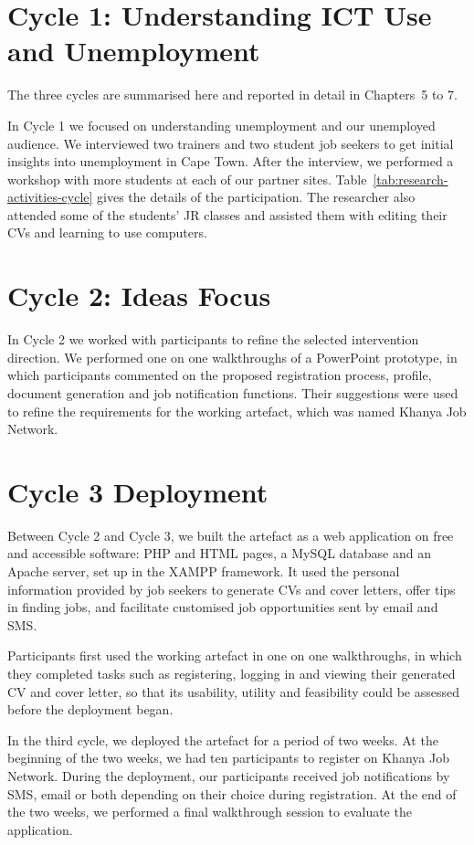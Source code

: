 \section{Cycle 1: Understanding ICT Use and Unemployment}

The three cycles are summarised here and reported in detail in Chapters~5 to 7.

In Cycle 1 we focused on understanding unemployment and our unemployed audience. We interviewed two trainers and two student job seekers to get initial insights into unemployment in Cape Town. After the interview, we performed a workshop with more students at each of our partner sites. Table~\ref{tab:research-activities-cycle} gives the details of the participation. The researcher also attended some of the students’ JR classes and assisted them with editing their CVs and learning to use computers.


\section{Cycle 2: Ideas Focus}

In Cycle 2 we worked with participants to refine the selected intervention direction. We performed one on one walkthroughs of a PowerPoint prototype, in which participants commented on the proposed registration process, profile, document generation and job notification functions. Their suggestions were used to refine the requirements for the working artefact, which was named Khanya Job Network.


\section{Cycle 3 Deployment}

Between Cycle 2 and Cycle 3, we built the artefact as a web application on free and accessible software: PHP and HTML pages, a MySQL database and an Apache server, set up in the XAMPP framework. It used the personal information provided by job seekers to generate CVs and cover letters, offer tips in finding jobs, and facilitate customised job opportunities sent by email and SMS.

Participants first used the working artefact in one on one walkthroughs, in which they completed tasks such as registering, logging in and viewing their generated CV and cover letter, so that its usability, utility and feasibility could be assessed before the deployment began.

In the third cycle, we deployed the artefact for a period of two weeks. At the beginning of the two weeks, we had ten participants to register on Khanya Job Network. During the deployment, our participants received job notifications by SMS, email or both depending on their choice during registration. At the end of the two weeks, we performed a final walkthrough session to evaluate the application.